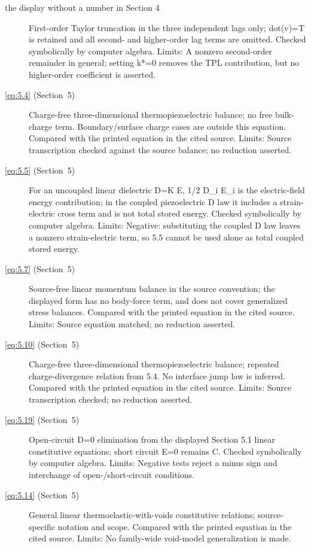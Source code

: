 \begin{description}
  \item[the display without a number in Section 4] First-order Taylor truncation in the three independent lags only; dot(v)=T is retained and all second- and higher-order lag terms are omitted. Checked symbolically by computer algebra. Limits: A nonzero second-order remainder in general; setting k*=0 removes the TPL contribution, but no higher-order coefficient is asserted.

  \item[\eqref{eq:5.4} (Section~5)] Charge-free three-dimensional thermopiezoelectric balance; no free bulk-charge term. Boundary/surface charge cases are outside this equation. Compared with the printed equation in the cited source. Limits: Source transcription checked against the source balance; no reduction asserted.

  \item[\eqref{eq:5.5} (Section~5)] For an uncoupled linear dielectric D=K E, 1/2 D_i E_i is the electric-field energy contribution; in the coupled piezoelectric D law it includes a strain-electric cross term and is not total stored energy. Checked symbolically by computer algebra. Limits: Negative: substituting the coupled D law leaves a nonzero strain-electric term, so 5.5 cannot be used alone as total coupled stored energy.

  \item[\eqref{eq:5.7} (Section~5)] Source-free linear momentum balance in the source convention; the displayed form has no body-force term, and does not cover generalized stress balances. Compared with the printed equation in the cited source. Limits: Source equation matched; no reduction asserted.

  \item[\eqref{eq:5.10} (Section~5)] Charge-free three-dimensional thermopiezoelectric balance; repeated charge-divergence relation from 5.4. No interface jump law is inferred. Compared with the printed equation in the cited source. Limits: Source transcription checked; no reduction asserted.

  \item[\eqref{eq:5.19} (Section~5)] Open-circuit D=0 elimination from the displayed Section 5.1 linear constitutive equations; short circuit E=0 remains C. Checked symbolically by computer algebra. Limits: Negative tests reject a minus sign and interchange of open-/short-circuit conditions.

  \item[\eqref{eq:5.14} (Section~5)] General linear thermoelastic-with-voids constitutive relations; source-specific notation and scope. Compared with the printed equation in the cited source. Limits: No family-wide void-model generalization is made.


\end{description}

